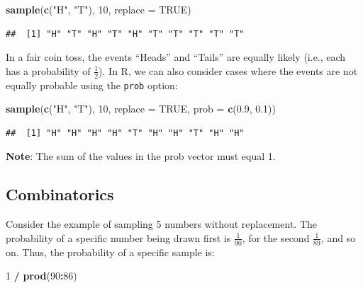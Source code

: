 \documentclass[
]{article}
\newenvironment{Shaded}{\begin{snugshade}}{\end{snugshade}}
\newcommand{\AttributeTok}[1]{\textcolor[rgb]{0.13,0.29,0.53}{#1}}
\newcommand{\ConstantTok}[1]{\textcolor[rgb]{0.56,0.35,0.01}{#1}}
\newcommand{\DecValTok}[1]{\textcolor[rgb]{0.00,0.00,0.81}{#1}}
\newcommand{\FloatTok}[1]{\textcolor[rgb]{0.00,0.00,0.81}{#1}}
\newcommand{\FunctionTok}[1]{\textcolor[rgb]{0.13,0.29,0.53}{\textbf{#1}}}
\newcommand{\NormalTok}[1]{#1}
\newcommand{\SpecialCharTok}[1]{\textcolor[rgb]{0.81,0.36,0.00}{\textbf{#1}}}
\newcommand{\StringTok}[1]{\textcolor[rgb]{0.31,0.60,0.02}{#1}}
\begin{document}
\begin{Shaded}
\begin{Highlighting}[]
\FunctionTok{sample}\NormalTok{(}\FunctionTok{c}\NormalTok{(}\StringTok{"H"}\NormalTok{, }\StringTok{"T"}\NormalTok{), }\DecValTok{10}\NormalTok{, }\AttributeTok{replace =} \ConstantTok{TRUE}\NormalTok{)}
\end{Highlighting}
\end{Shaded}

\begin{verbatim}
##  [1] "H" "T" "H" "T" "H" "T" "T" "T" "T" "T"
\end{verbatim}

In a fair coin toss, the events ``Heads'' and ``Tails'' are equally
likely (i.e., each has a probability of \(\frac{1}{2}\)). In R, we can
also consider cases where the events are not equally probable using the
\texttt{prob} option:

\begin{Shaded}
\begin{Highlighting}[]
\FunctionTok{sample}\NormalTok{(}\FunctionTok{c}\NormalTok{(}\StringTok{"H"}\NormalTok{, }\StringTok{"T"}\NormalTok{), }\DecValTok{10}\NormalTok{, }\AttributeTok{replace =} \ConstantTok{TRUE}\NormalTok{, }\AttributeTok{prob =} \FunctionTok{c}\NormalTok{(}\FloatTok{0.9}\NormalTok{, }\FloatTok{0.1}\NormalTok{))}
\end{Highlighting}
\end{Shaded}

\begin{verbatim}
##  [1] "H" "H" "H" "H" "T" "H" "H" "T" "H" "H"
\end{verbatim}

\textbf{Note}: The sum of the values in the prob vector must equal 1.

\hypertarget{combinatorics}{%
\subsection{Combinatorics}\label{combinatorics}}

Consider the example of sampling 5 numbers without replacement. The
probability of a specific number being drawn first is \(\frac{1}{90}\),
for the second \(\frac{1}{89}\), and so on. Thus, the probability of a
specific sample is:

\begin{Shaded}
\begin{Highlighting}[]
\DecValTok{1} \SpecialCharTok{/} \FunctionTok{prod}\NormalTok{(}\DecValTok{90}\SpecialCharTok{:}\DecValTok{86}\NormalTok{)}
\end{Highlighting}
\end{Shaded}
\end{document}
